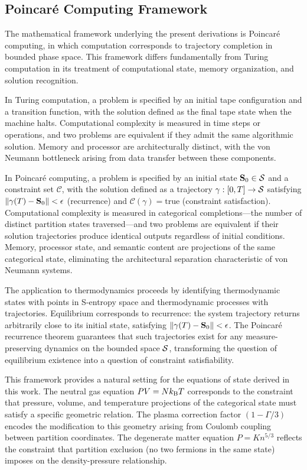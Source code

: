 \subsection{Poincaré Computing Framework}

The mathematical framework underlying the present derivations is Poincaré computing, in which computation corresponds to trajectory completion in bounded phase space. This framework differs fundamentally from Turing computation in its treatment of computational state, memory organization, and solution recognition.

In Turing computation, a problem is specified by an initial tape configuration and a transition function, with the solution defined as the final tape state when the machine halts. Computational complexity is measured in time steps or operations, and two problems are equivalent if they admit the same algorithmic solution. Memory and processor are architecturally distinct, with the von Neumann bottleneck arising from data transfer between these components.

In Poincaré computing, a problem is specified by an initial state $\mathbf{S}_0 \in \mathcal{S}$ and a constraint set $\mathcal{C}$, with the solution defined as a trajectory $\gamma: [0,T] \to \mathcal{S}$ satisfying $\|\gamma(T) - \mathbf{S}_0\| < \epsilon$ (recurrence) and $\mathcal{C}(\gamma) = \text{true}$ (constraint satisfaction). Computational complexity is measured in categorical completions—the number of distinct partition states traversed—and two problems are equivalent if their solution trajectories produce identical outputs regardless of initial conditions. Memory, processor state, and semantic content are projections of the same categorical state, eliminating the architectural separation characteristic of von Neumann systems.

The application to thermodynamics proceeds by identifying thermodynamic states with points in S-entropy space and thermodynamic processes with trajectories. Equilibrium corresponds to recurrence: the system trajectory returns arbitrarily close to its initial state, satisfying $\|\gamma(T) - \mathbf{S}_0\| < \epsilon$. The Poincaré recurrence theorem \citep{poincare1890} guarantees that such trajectories exist for any measure-preserving dynamics on the bounded space $\mathcal{S}$, transforming the question of equilibrium existence into a question of constraint satisfiability.

This framework provides a natural setting for the equations of state derived in this work. The neutral gas equation $PV = Nk_{\mathrm{B}} T$ corresponds to the constraint that pressure, volume, and temperature projections of the categorical state must satisfy a specific geometric relation. The plasma correction factor $(1 - \Gamma/3)$ encodes the modification to this geometry arising from Coulomb coupling between partition coordinates. The degenerate matter equation $P = K n^{5/3}$ reflects the constraint that partition exclusion (no two fermions in the same state) imposes on the density-pressure relationship.

